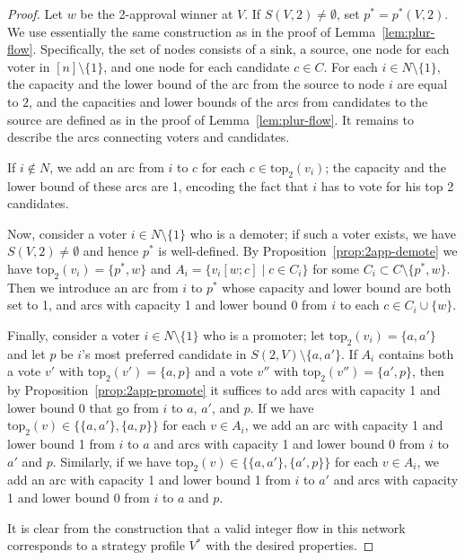 \documentclass[11pt]{article}
\newcommand{\tp}{\mathrm{top}}
\begin{document}
\begin{proof}
Let $w$ be the 2-approval winner at $V$. If $S(V, 2)\neq\emptyset$, set $p^*=p^*(V, 2)$.
We use essentially the same construction as in the proof of Lemma~\ref{lem:plur-flow}.
Specifically, the set of nodes consists of a sink, a source, one node for each
voter in $[n]\setminus\{1\}$, and one node for each candidate $c\in C$.
For each $i\in N\setminus\{1\}$, the capacity and the lower bound 
of the arc from the source to node $i$ are equal to $2$, and the capacities 
and lower bounds of the arcs from candidates 
to the source are defined as in the proof of Lemma~\ref{lem:plur-flow}. 
It remains to describe the arcs connecting voters and candidates.

If $i\not\in N$, we add an arc from $i$ to $c$ for each $c\in\tp_2(v_i)$;
the capacity and the lower bound of these arcs are 1, encoding the fact that
$i$ has to vote for his top 2 candidates.

Now, consider a voter $i\in N\setminus\{1\}$ who is a demoter;
if such a voter exists, we have $S(V, 2)\neq\emptyset$ and hence $p^*$ is well-defined. 
By Proposition~\ref{prop:2app-demote} we have $\tp_2(v_i)=\{p^*, w\}$
and $A_i=\{v_i[w;c]\mid c\in C_i\}$ for some $C_i\subset C\setminus\{p^*, w\}$. 
Then we introduce an arc from $i$ to $p^*$ whose capacity and lower bound are both set to 1, 
and arcs with capacity 1 and lower bound 0 from $i$ to each $c\in C_i\cup\{w\}$.

Finally, consider a voter $i\in N\setminus\{1\}$ who is a promoter;
let $\tp_2(v_i)=\{a, a'\}$ and let $p$ be $i$'s most preferred candidate
in $S(2, V)\setminus\{a, a'\}$. If $A_i$ contains both a vote $v'$
with $\tp_2(v')=\{a, p\}$ and a vote $v''$ with $\tp_2(v'')=\{a', p\}$, then
by Proposition~\ref{prop:2app-promote} it suffices to add arcs with capacity 1 and lower bound
0 that go from $i$ to $a$, $a'$, and $p$. If we have $\tp_2(v)\in\{\{a, a'\}, \{a, p\}\}$
for each $v\in A_i$, we add an arc with capacity 1 and lower bound 1 from $i$ to $a$
and arcs with capacity 1 and lower bound 0 from $i$ to $a'$ and $p$.
Similarly, if we have $\tp_2(v)\in\{\{a, a'\}, \{a', p\}\}$
for each $v\in A_i$, we add an arc with capacity 1 and lower bound 1 from $i$ to $a'$ 
and arcs with capacity 1 and lower bound 0 from $i$ to $a$ and $p$.

It is clear from the construction that a valid integer flow in this network 
corresponds to a strategy profile $V^*$ with the desired properties.
\end{proof}
\end{document}

